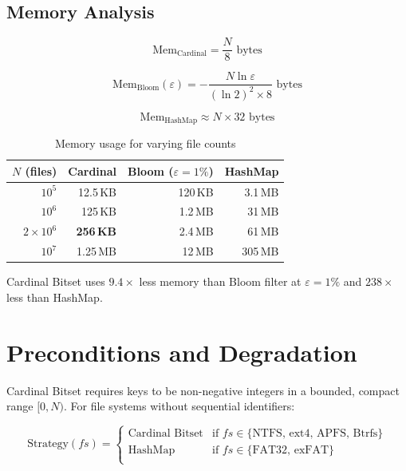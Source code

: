 \documentclass[11pt,twocolumn]{article}
\begin{document}
\subsection{Memory Analysis}

\begin{equation}
\text{Mem}_{\text{Cardinal}} = \frac{N}{8} \text{ bytes}
\end{equation}

\begin{equation}
\text{Mem}_{\text{Bloom}}(\varepsilon) = -\frac{N \ln \varepsilon}{(\ln 2)^2 \times 8} \text{ bytes}
\end{equation}

\begin{equation}
\text{Mem}_{\text{HashMap}} \approx N \times 32 \text{ bytes}
\end{equation}

\begin{table}[h]
\centering
\caption{Memory usage for varying file counts}
\label{tab:memory}
\begin{tabular}{@{}rrrr@{}}
\toprule
$N$ (files) & Cardinal & Bloom ($\varepsilon\!=\!1\%$) & HashMap \\
\midrule
$10^5$ & 12.5\,KB & 120\,KB & 3.1\,MB \\
$10^6$ & 125\,KB & 1.2\,MB & 31\,MB \\
$2 \times 10^6$ & \textbf{256\,KB} & 2.4\,MB & 61\,MB \\
$10^7$ & 1.25\,MB & 12\,MB & 305\,MB \\
\bottomrule
\end{tabular}
\end{table}

Cardinal Bitset uses $9.4\times$ less memory than Bloom filter at $\varepsilon = 1\%$ and $238\times$ less than HashMap.

\section{Preconditions and Degradation}

Cardinal Bitset requires keys to be non-negative integers in a bounded, compact range $[0, N)$. For file systems without sequential identifiers:

\begin{equation}
\text{Strategy}(fs) = \begin{cases}
\text{Cardinal Bitset} & \text{if } fs \in \{\text{NTFS, ext4, APFS, Btrfs}\} \\
\text{HashMap} & \text{if } fs \in \{\text{FAT32, exFAT}\} \\
\end{cases}
\end{equation}
\end{document}
